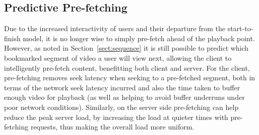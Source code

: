 \documentclass[a4paper,11pt]{article}
\begin{document}




\subsection{Predictive Pre-fetching}

Due to the increased interactivity of users and their departure from the start-to-finish model, it is no longer wise to simply pre-fetch ahead of the playback point. However, as noted in Section~\ref{sect:sequence} it is still possible to predict which bookmarked segment of video a user will view next, allowing the client to intelligently pre-fetch content, benefitting both client and server. For the client, pre-fetching removes seek latency when seeking to a pre-fetched segment, both in terms of the network seek latency incurred and also the time taken to buffer enough video for playback (as well as helping to avoid buffer underruns under poor network conditions). Similarly, on the server side pre-fetching can help reduce the peak server load, by increasing the load at quieter times with pre-fetching requests, thus making the overall load more uniform.
\end{document}
